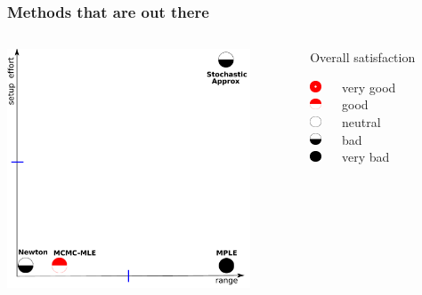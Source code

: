 \documentclass[ 10pt]{beamer}
\begin{document}
\frame
{
\frametitle{Methods that are out there}
\begin{columns}[]
\begin{column}[T]{0.6\textwidth}
\includegraphics[height=2.8in]{mck-final.pdf}
\end{column}
\begin{column}[t]{0.4\textwidth}
{\small
Overall satisfaction
\vspace{1mm}

\includegraphics[height=0.13in]{CR5.pdf} $\quad$ very good\\
\vspace{1mm}
\includegraphics[height=0.13in]{CR4.pdf} $\quad$ good\\
\vspace{1mm}
\includegraphics[height=0.13in]{CR3.pdf} $\quad$ neutral\\
\vspace{1mm}
\includegraphics[height=0.13in]{CR2.pdf} $\quad$ bad\\
\vspace{1mm}
\includegraphics[height=0.13in]{CR1.pdf} $\quad$ very bad\\
\vspace{2mm}
}

\end{column}
\end{columns}
}
\end{document}
